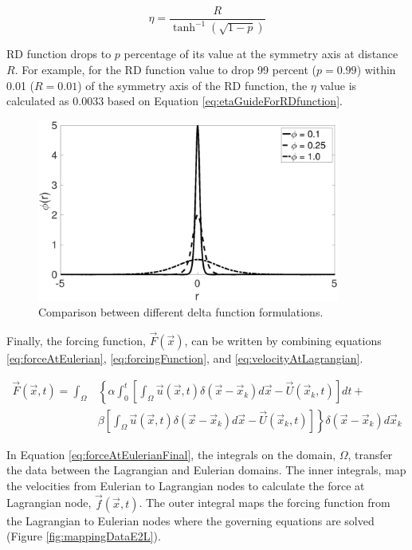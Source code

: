 \documentclass[12pt]{aiaa-pretty}
\begin{document}
\begin{equation}\label{eq:etaGuideForRDfunction}
    \eta = \frac{R}{\tanh^{-1} (\sqrt{1 - p})}
\end{equation}

RD function drops to $p$ percentage of its value at the symmetry axis at distance $R$. For example, for the RD function value to drop 99 percent ($p = 0.99$) within 0.01 ($R = 0.01$) of the symmetry axis of the RD function, the $\eta$ value is calculated as $0.0033$ based on Equation \eqref{eq:etaGuideForRDfunction}.

%
\begin{figure}[H]
	\centering
	\includegraphics[height=6.0cm]{figure/heaviside_comparison.eps}
	\caption{Comparison between different delta function formulations.}
	\label{fig:heavisideComparison}
\end{figure}
%

Finally, the forcing function, $\vec{F}(\vec{x})$, can be written by combining equations \eqref{eq:forceAtEulerian}, \eqref{eq:forcingFunction}, and \eqref{eq:velocityAtLagrangian}.

%
\begin{equation}
\begin{aligned}\label{eq:forceAtEulerianFinal}
	\vec{F}(\vec{x}, t) = 
	\int_\Omega 
	&\left\{
 	\alpha \int_0^t
	\left[
	\int_\Omega \vec{u} (\vec{x}, t) \delta(\vec{x} - \vec{x}_k) d\vec{x} - \vec{U}\left( \vec{x}_k, t \right)
	\right]dt + \right. \\
	&\left.
	\beta \left[
	\int_\Omega \vec{u} (\vec{x}, t) \delta(\vec{x} - \vec{x}_k) d\vec{x} - \vec{U}\left( \vec{x}_k, t \right)
	\right]
	\right\} \delta(\vec{x} - \vec{x}_k) d\vec{x}_k
\end{aligned}
\end{equation}
%

In Equation \eqref{eq:forceAtEulerianFinal}, the integrals on the domain, $\Omega$, transfer the data between the Lagrangian and Eulerian domains. The inner integrals, map the velocities from Eulerian to Lagrangian nodes to calculate the force at Lagrangian node, $\vec{f}\left( \vec{x}, t \right)$. The outer integral maps the forcing function from the Lagrangian to Eulerian nodes where the governing equations are solved (Figure \ref{fig:mappingDataE2L}).
\end{document}
